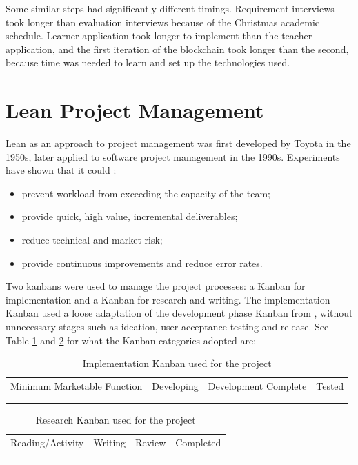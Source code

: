 Some similar steps had significantly different timings. Requirement interviews took longer 
than evaluation interviews because of the Christmas academic schedule. Learner application 
took longer to implement than the teacher application, and the first iteration of the blockchain 
took longer than the second, because time was needed to learn and set up the technologies used.

\section{Lean Project Management}

Lean as an approach to project management was first developed by Toyota in the 1950s, later 
applied to software project management in the 1990s. Experiments have shown that it could \citep[p.30]{middleton2012lean}: 

\begin{itemize}
    \setlength\itemsep{0em}    
    \item prevent workload from exceeding the capacity of the team;
    \item provide quick, high value, incremental deliverables;
    \item reduce technical and market risk;
    \item provide continuous improvements and reduce error rates.
\end{itemize}

Two kanbans were used to manage the project processes: a Kanban for implementation and 
a Kanban for research and writing. The implementation Kanban used
a loose adaptation of the development phase Kanban from \citet[p.25]{middleton2012lean}, 
without unnecessary stages such as ideation, user acceptance testing and release.
See Table \ref{table:kanban-implementation} and \ref{table:kanban-research} for what the Kanban categories adopted are:

\begin{table}[!ht] 
    \caption{Implementation Kanban used for the project}
    \centering
    \label{table:kanban-implementation}
    \begin{tabular}{|c|c|c|c|}
        \hline
        Minimum Marketable Function & Developing & Development Complete & Tested \\
        &&&\\
        &&&\\
        \hline
    \end{tabular}
\end{table}
\begin{table}[!ht] 
    \caption{Research Kanban used for the project}
    \centering
    \label{table:kanban-research}
    \begin{tabular}{|c|c|c|c|}
        \hline
        Reading/Activity & Writing & Review & Completed\\
        &&&\\
        &&&\\        
        \hline
    \end{tabular}
\end{table}

